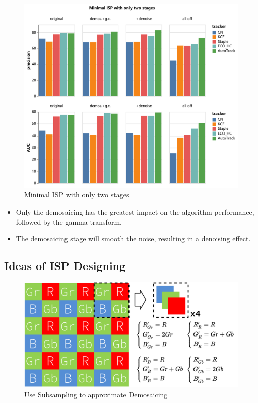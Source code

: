 \documentclass{beamer}
\begin{document}
\begin{frame}
    \begin{figure}[htpb]
        \begin{center}
            \includegraphics[width=0.7\linewidth]{fig/mini.pdf}
            \caption{Minimal ISP with only two stages}
        \end{center}
    \end{figure}
\end{frame}

\begin{frame}
    \begin{itemize}[<+-| alert@+>]
        \item Only the demosaicing has the greatest impact on the algorithm performance, followed by the gamma transform.
        \item The demosaicing stage will smooth the noise, resulting in a denoising effect.
    \end{itemize}
\end{frame}

\subsection{Ideas of ISP Designing}

\begin{frame}
    \begin{figure}[htpb]
        \begin{center}
            \includegraphics[width=0.8\linewidth]{fig/isp_dem_1.pdf}
            \caption{Use Subsampling to approximate Demosaicing}
        \end{center}
    \end{figure}
\end{frame}
\end{document}
